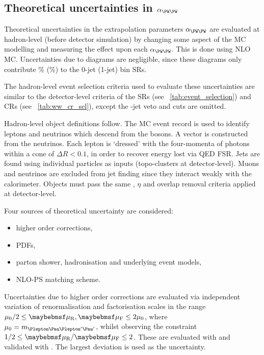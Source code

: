\subsection{Theoretical uncertainties in $\alpha_{\WW}$}
\label{sec:ww_bkg:alpha}

Theoretical uncertainties in the extrapolation parameters $\alpha_{\WW}$ are evaluated 
at hadron-level (\ie before detector simulation) by changing some aspect of the MC 
modelling and measuring the effect upon each $\alpha_{\WW}$. This is done using NLO \WW 
MC. Uncertainties due to \ggWW diagrams are negligible, since these diagrams only 
contribute \% (\%) to the 0-jet (1-jet) bin SRs.

The hadron-level event selection criteria used to evaluate these uncertainties are similar to 
the detector-level criteria of the SRs (see \Table~\ref{tab:event_selection}) and CRs (see 
\Table~\ref{tab:ww_cr_sel}), except the \Pbottom-jet veto and \frecoil cuts are omitted.

Hadron-level object definitions follow. The MC event record is used to identify leptons 
and neutrinos which descend from the \PW bosons. A \truthmetvec vector is constructed from 
the neutrinos. Each lepton is `dressed' with the four-momenta of photons within a cone of 
$\Delta R < 0.1$, in order to recover energy lost via QED FSR. Jets are found using 
individual particles as inputs (\cf topo-clusters at detector-level). Muons and neutrinos 
are excluded from jet finding since they interact weakly with the calorimeter. Objects 
must pass the same \pt, $\eta$ and overlap removal criteria applied at detector-level.

Four sources of theoretical uncertainty are considered:
\begin{itemize}[noitemsep,nolistsep]
	\item higher order corrections,
	\item PDFs,
	\item parton shower, hadronisation and underlying event models,
	\item NLO-PS matching scheme.
\end{itemize}

Uncertainties due to higher order corrections are evaluated via independent variation of 
renormalisation and factorisation scales in the range $\mu_0/2 \leq \mur,\muf 
\leq 2\mu_0$, where $\mu_0 = m_{\HepProcess{\Plepton\Pnu\Plepton'\Pnu'}}$, whilst observing 
the constraint $1/2 \leq \mur/\muf \leq 2$. These are evaluated with \amcatnlo and validated 
with \mcfm. The largest deviation is used as the uncertainty.

